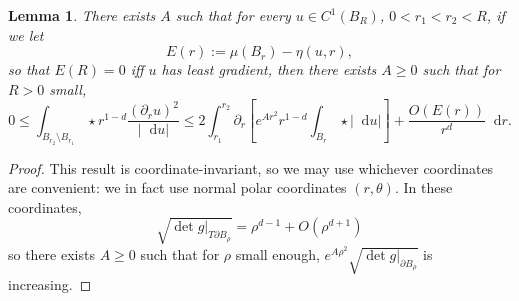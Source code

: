 \documentclass[reqno,11pt]{amsart}
\newcommand*\dif{\mathop{}\!\mathrm{d}}
\newtheorem{lemma}[theorem]{Lemma}
\theoremstyle{definition}
\numberwithin{equation}{section}
\begin{document}
\begin{lemma}\label{monotonicity lemma}
There exists $A$ such that for every $u \in C^1(B_R)$, $0 < r_1 < r_2 < R$, if we let
$$E(r) := \mu(B_r) - \eta(u, r),$$
so that $E(R) = 0$ iff $u$ has least gradient, then there exists $A \geq 0$ such that for $R > 0$ small,
\begin{equation}\label{monotonicity lemma eqn}
0 \leq \int_{B_{r_2} \setminus B_{r_1}} \star r^{1 - d}\frac{(\partial_ru)^2}{|\dif u|} \leq 2\int_{r_1}^{r_2} \partial_r \left[e^{Ar^2} r^{1-d}\int_{B_r} \star |\dif u|\right] + \frac{O(E(r))}{r^d} \dif r.
\end{equation}
\end{lemma}
\begin{proof}
This result is coordinate-invariant, so we may use whichever coordinates are convenient: we in fact use normal polar coordinates $(r, \theta)$.
In these coordinates, 
$$\sqrt{\det g|_{T\partial B_\rho}} = \rho^{d - 1} + O(\rho^{d + 1})$$
so there exists $A \geq 0$ such that for $\rho$ small enough, $e^{A\rho^2} \sqrt{\det g|_{\partial B_\rho}}$ is increasing.


\end{proof}
\end{document}
